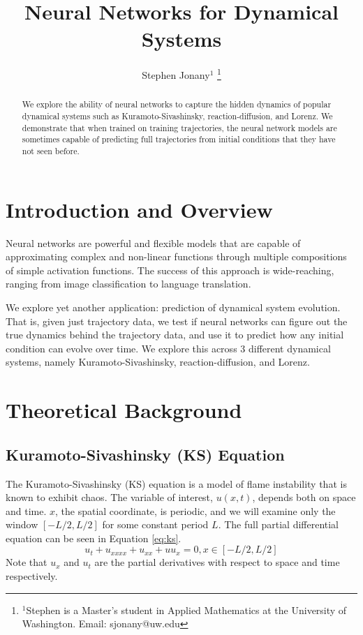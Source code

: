 \documentclass[letterpaper, 10 pt, conference]{ieeeconf}  %
\title{\LARGE \bf
Neural Networks for Dynamical Systems
}
\author{Stephen Jonany$^{1}$ %
\thanks{$^{1}$Stephen is a Master's student in Applied Mathematics at the 
University of Washington.
Email: sjonany@uw.edu}%
}
\begin{document}
\maketitle
\pagestyle{plain}


\begin{abstract}
We explore the ability of neural networks to capture the hidden dynamics of popular dynamical systems such as Kuramoto-Sivashinsky, reaction-diffusion, and Lorenz. We demonstrate that when trained on training trajectories, the neural network models are sometimes capable of predicting full trajectories from initial conditions that they have not seen before.
\end{abstract}

\section{Introduction and Overview}
Neural networks are powerful and flexible models that are capable of approximating complex and non-linear functions through multiple compositions of simple activation functions. The success of this approach is wide-reaching, ranging from image classification to language translation.

We explore yet another application: prediction of dynamical system evolution. That is, given just trajectory data, we test if neural networks can figure out the true dynamics behind the trajectory data, and use it to predict how any initial condition can evolve over time. We explore this across 3 different dynamical systems, namely Kuramoto-Sivashinsky, reaction-diffusion, and Lorenz.
\section{Theoretical Background}
\subsection{Kuramoto-Sivashinsky (KS) Equation}
\label{section:ks}
The Kuramoto-Sivashinsky (KS) equation \cite{ks} is a model of flame instability that is known to exhibit chaos. The variable of interest, $u(x,t)$, depends both on space and time. $x$, the spatial coordinate, is periodic, and we will examine only the window $[-L/2, L/2]$ for some constant period $L$. The full partial differential equation can be seen in Equation \ref{eq:ks}.
\begin{equation}
\label{eq:ks}
u_t + u_{xxxx} + u_{xx} + u u_x = 0, x \in [-L/2, L/2]
\end{equation}
Note that $u_x$ and $u_t$ are the partial derivatives with respect to space and time respectively. 
\end{document}
